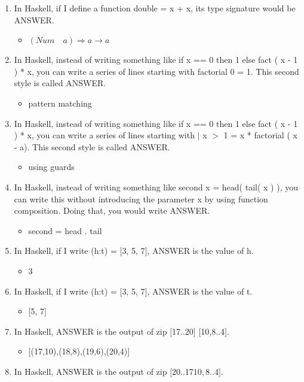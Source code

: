 \documentclass{exam}
\begin{document}
\begin{enumerate}
\item In Haskell, if I define a function double = x + x, its type signature would be ANSWER.
\begin{itemize}
\item $(Num \quad a) \Rightarrow a \rightarrow a$
\end{itemize}
\item In Haskell, instead of writing something like if x == 0 then 1 else fact ( x - 1 ) * x, you can write a series of lines starting with factorial 0 = 1.  This second style is called ANSWER.
\begin{itemize}
\item pattern matching
\end{itemize}
\item In Haskell, instead of writing something like if x == 0 then 1 else fact ( x - 1 ) * x, you can write a series of lines starting with $|$ x $>$ 1 = x * factorial ( x - a).  This second style is called ANSWER.
\begin{itemize}
\item using guards
\end{itemize}
\item In Haskell, instead of writing something like second x = head( tail(  x ) ), you can write this without introducing the parameter x by using function composition.  Doing that, you would write ANSWER.
\begin{itemize}
\item second = head . tail
\end{itemize}
\item In Haskell, if I write (h:t) = $\lbrack$3, 5, 7$\rbrack$, ANSWER is the value of h.
\begin{itemize}
\item 3
\end{itemize}
\item In Haskell, if I write (h:t) = $\lbrack$3, 5, 7$\rbrack$, ANSWER is the value of t.
\begin{itemize}
\item $\lbrack$5, 7$\rbrack$
\end{itemize}
\item In Haskell, ANSWER is the output of zip $\lbrack$17..20$\rbrack$ $\lbrack$10,8..4$\rbrack$.
\begin{itemize}
\item $\lbrack$(17,10),(18,8),(19,6),(20,4)$\rbrack$
\end{itemize}
\item In Haskell, ANSWER is the output of zip $\lbrack$20..17\rbrack$ $\lbrack$10,8..4\rbrack$.

\end{enumerate}
\end{document}
